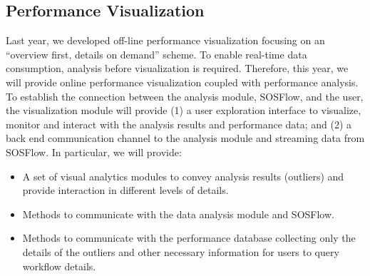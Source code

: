\subsection{Performance Visualization}
Last year, we developed off-line performance visualization focusing on an ``overview first, details on demand'' scheme. To enable real-time data consumption, analysis before visualization is required.  Therefore, this year, we will provide online performance visualization coupled with performance analysis.  
To establish the connection between the analysis module, SOSFlow, and the user, the visualization module will provide (1) a user exploration interface to visualize, monitor and interact with the analysis results and performance data; and (2) a back end communication channel to the analysis module and streaming data from SOSFlow.   In particular,
we will provide:
\begin{itemize}
\item A set of visual analytics modules to convey analysis results (outliers) and provide interaction in different levels of details.
\item Methods to communicate with the data analysis module and SOSFlow.
\item Methods to communicate with the performance database collecting only the details of the outliers and other necessary information for users to query workflow details.
\end{itemize}

